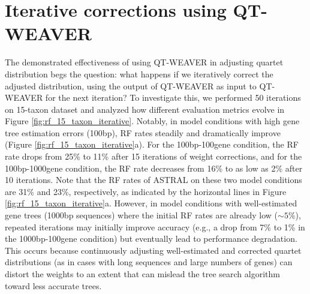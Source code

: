 \documentclass[runningheads]{llncs}
\begin{document}


\vspace{-12pt}
\section{Iterative corrections using QT-WEAVER}

The demonstrated effectiveness of using QT-WEAVER in adjusting quartet distribution begs the question: what happens if we iteratively correct the adjusted distribution, using the output of QT-WEAVER as input to QT-WEAVER for the next iteration? To investigate this, we performed 50 iterations on 15-taxon dataset and analyzed how different evaluation metrics evolve in Figure \ref{fig:rf_15_taxon_iterative}. Notably, in model conditions with high gene tree estimation errors (100bp), RF rates steadily and dramatically improve (Figure \ref{fig:rf_15_taxon_iterative}a). For the 100bp-100gene condition, the RF rate drops from 25\% to 11\% after 15 iterations of weight corrections, and for the 100bp-1000gene condition, the RF rate decreases from 16\% to as low as 2\% after 10 iterations. Note that the RF rates of ASTRAL on these two model conditions are 31\% and 23\%, respectively, as indicated by the horizontal lines in Figure \ref{fig:rf_15_taxon_iterative}a. However, in model conditions with well-estimated gene trees (1000bp sequences) where the initial RF rates are already low ($\sim 5\%$), repeated iterations may initially improve accuracy (e.g., a drop from 7\% to 1\% in the 1000bp-100gene condition) but eventually lead to performance degradation. This occurs because continuously adjusting well-estimated and corrected quartet distributions (as in cases with long sequences and large numbers of genes) can distort the weights to an extent that can mislead the tree search algorithm toward less accurate trees.
\end{document}
